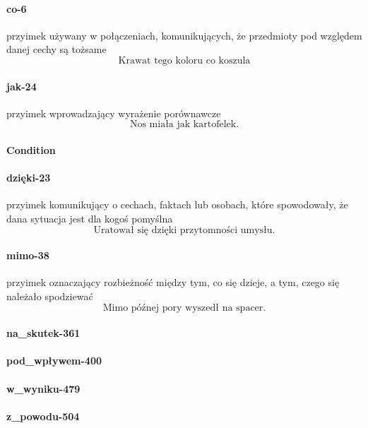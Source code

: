 \documentclass[a4paper, 12pt]{article}
\theoremstyle{remark}
\begin{document}
\paragraph{co-6} \label{prep-6}	przyimek używany w połączeniach, komunikujących, że przedmioty pod względem danej cechy są tożsame
\begin{equation}
\text{Krawat tego koloru co koszula}
\end{equation}
\paragraph{jak-24} \label{prep-24}	przyimek wprowadzający wyrażenie porównawcze
\begin{equation}
\text{Nos miała jak kartofelek.}
\end{equation}
\paragraph{Condition} %
\label{sub:condition}
\paragraph{dzięki-23} \label{prep-23}	przyimek komunikujący o cechach, faktach lub osobach, które spowodowały, że dana sytuacja jest dla kogoś pomyślna
\begin{equation}
\text{Uratował się dzięki przytomności umysłu.}
\end{equation}
\paragraph{mimo-38} \label{prep-38}	przyimek oznaczający rozbieżność między tym, co się dzieje, a tym, czego się należało spodziewać
\begin{equation}
\text{Mimo późnej pory wyszedł na spacer.}
\end{equation}
\paragraph{na\_skutek-361} \label{prep-361}
\paragraph{pod\_wpływem-400} \label{prep-400}
\paragraph{w\_wyniku-479} \label{prep-479}
\paragraph{z\_powodu-504} \label{prep-504}
\end{document}

